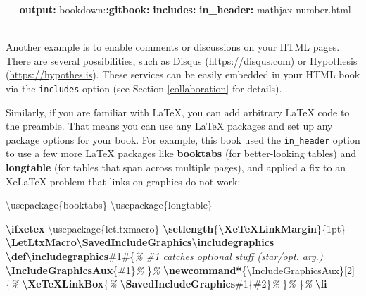 \documentclass[
  12pt,
]{krantz}
\newenvironment{Shaded}{\begin{snugshade}}{\end{snugshade}}
\newcommand{\AttributeTok}[1]{\textcolor[rgb]{0.13,0.29,0.53}{#1}}
\newcommand{\BuiltInTok}[1]{#1}
\newcommand{\CommentTok}[1]{\textcolor[rgb]{0.56,0.35,0.01}{\textit{#1}}}
\newcommand{\ExtensionTok}[1]{#1}
\newcommand{\FunctionTok}[1]{\textcolor[rgb]{0.13,0.29,0.53}{\textbf{#1}}}
\newcommand{\KeywordTok}[1]{\textcolor[rgb]{0.13,0.29,0.53}{\textbf{#1}}}
\newcommand{\NormalTok}[1]{#1}
\newcommand{\PreprocessorTok}[1]{\textcolor[rgb]{0.56,0.35,0.01}{\textit{#1}}}
\begin{document}
\begin{Shaded}
\begin{Highlighting}[]
\PreprocessorTok{{-}{-}{-}}
\FunctionTok{output}\KeywordTok{:}
\AttributeTok{  bookdown:}\FunctionTok{:gitbook}\KeywordTok{:}
\AttributeTok{    }\FunctionTok{includes}\KeywordTok{:}
\AttributeTok{      }\FunctionTok{in\_header}\KeywordTok{:}\AttributeTok{ mathjax{-}number.html}
\PreprocessorTok{{-}{-}{-}}
\end{Highlighting}
\end{Shaded}

Another example is to enable comments or discussions on your HTML pages. There are several possibilities, such as Disqus (\url{https://disqus.com}) or Hypothesis (\url{https://hypothes.is}). These services can be easily embedded in your HTML book via the \texttt{includes} option (see Section \ref{collaboration} for details).

Similarly, if you are familiar with LaTeX, you can add arbitrary LaTeX code to the preamble. That means you can use any LaTeX packages and set up any package options for your book. For example, this book used the \texttt{in\_header} option to use a few more LaTeX packages like \textbf{booktabs} (for better-looking tables) and \textbf{longtable} (for tables that span across multiple pages), and applied a fix to an XeLaTeX problem that links on graphics do not work:

\begin{Shaded}
\begin{Highlighting}[]
\BuiltInTok{\textbackslash{}usepackage}\NormalTok{\{}\ExtensionTok{booktabs}\NormalTok{\}}
\BuiltInTok{\textbackslash{}usepackage}\NormalTok{\{}\ExtensionTok{longtable}\NormalTok{\}}

\FunctionTok{\textbackslash{}ifxetex}
  \BuiltInTok{\textbackslash{}usepackage}\NormalTok{\{}\ExtensionTok{letltxmacro}\NormalTok{\}}
  \FunctionTok{\textbackslash{}setlength}\NormalTok{\{}\FunctionTok{\textbackslash{}XeTeXLinkMargin}\NormalTok{\}\{1pt\}}
  \FunctionTok{\textbackslash{}LetLtxMacro\textbackslash{}SavedIncludeGraphics\textbackslash{}includegraphics}
  \FunctionTok{\textbackslash{}def\textbackslash{}includegraphics}\NormalTok{\#1\#\{}\CommentTok{\% \#1 catches optional stuff (star/opt. arg.)}
    \FunctionTok{\textbackslash{}IncludeGraphicsAux}\NormalTok{\{\#1\}}\CommentTok{\%}
\NormalTok{  \}}\CommentTok{\%}
  \FunctionTok{\textbackslash{}newcommand*}\NormalTok{\{}\ExtensionTok{\textbackslash{}IncludeGraphicsAux}\NormalTok{\}[2]\{}\CommentTok{\%}
    \FunctionTok{\textbackslash{}XeTeXLinkBox}\NormalTok{\{}\CommentTok{\%}
      \FunctionTok{\textbackslash{}SavedIncludeGraphics}\NormalTok{\#1\{\#2\}}\CommentTok{\%}
\NormalTok{    \}}\CommentTok{\%}
\NormalTok{  \}}\CommentTok{\%}
\FunctionTok{\textbackslash{}fi}
\end{Highlighting}
\end{Shaded}
\end{document}

